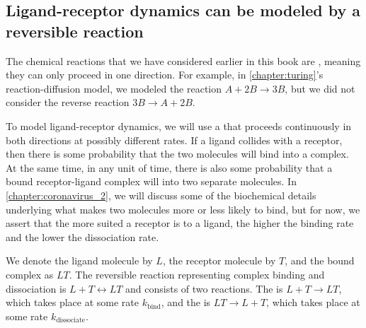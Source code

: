 \FloatBarrier
\nopagebreak
{}
\subsection{Ligand-receptor dynamics can be modeled by a reversible reaction}

The chemical reactions that we have considered earlier in this book are , meaning they can only proceed in one direction. For example, in \autoref{chapter:turing}'s reaction-diffusion model, we modeled the reaction $A + 2B \rightarrow 3B$, but we did not consider the reverse reaction $3B \rightarrow A + 2B$.

To model ligand-receptor dynamics, we will use a  that proceeds continuously in both directions at possibly different rates. If a ligand collides with a receptor, then there is some probability that the two molecules will bind into a complex. At the same time, in any unit of time, there is also some probability that a bound receptor-ligand complex will  into two separate molecules. In \autoref{chapter:coronavirus_2}, we will discuss some of the biochemical details underlying what makes two molecules more or less likely to bind, but for now, we assert that the more suited a receptor is to a ligand, the higher the binding rate and the lower the dissociation rate.\\

\begin{note}\end{note}

We denote the ligand molecule by $L$, the receptor molecule by $T$, and the bound complex as $LT$. The reversible reaction representing complex binding and dissociation is $L + T \longleftrightarrow LT$ and consists of two reactions. The  is $L + T \rightarrow LT$, which takes place at some rate $k_\text{bind}$, and the  is $LT \rightarrow L + T$, which takes place at some rate $k_\text{dissociate}$.

